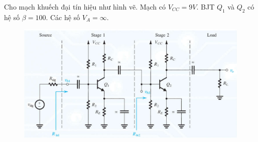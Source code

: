 
Cho mạch khuếch đại tín hiệu như hình vẽ. Mạch có $V_{CC}=9V$. BJT $Q_{1}$ và $Q_{2}$ có hệ số $\beta = 100$. Các hệ số $V_{A} = \infty$.

\begin{figure}[H]
	\centering
	\includegraphics[width=.8\linewidth]{./my-chapters/my-images/Question10/Debai.png}
\end{figure}



